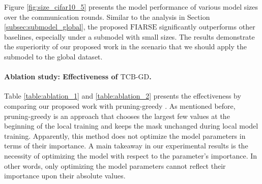 \documentclass{article}
\renewcommand{\cite}{\citep}
\theoremstyle{plain}
\theoremstyle{definition}
\theoremstyle{remark}
\newcommand{\algo}{\ensuremath{\text{FIARSE}}\xspace}
\newcommand{\module}{\ensuremath{\text{TCB-GD}}\xspace}
\begin{document}
Figure \ref{fig:size_cifar10_5} presents the model performance of various model sizes over the communication rounds. Similar to the analysis in Section \ref{subsec:submodel_global}, the proposed \algo significantly outperforms other baselines, especially under a submodel with small sizes. The results demonstrate the superiority of our proposed work in the scenario that we should apply the submodel to the global dataset. 

\paragraph{Ablation study: Effectiveness of \module.}  Table \ref{table:ablation_1} and \ref{table:ablation_2} presents the effectiveness by comparing our proposed work with pruning-greedy \cite{zhou2023every}. As mentioned before, pruning-greedy is an approach that chooses the largest few values at the beginning of the local training and keeps the mask unchanged during local model training. Apparently, this method does not optimize the model parameters in terms of their importance. A main takeaway in our experimental results is the necessity of optimizing the model with respect to the parameter's importance. In other words, only optimizing the model parameters cannot reflect their importance upon their absolute values. 
\end{document}
